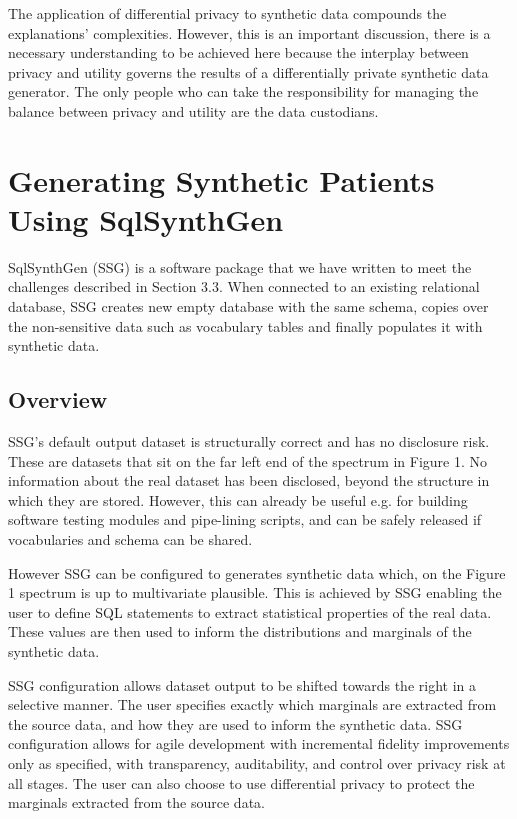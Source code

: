 \documentclass[11pt]{article}
\begin{document}
The application of differential privacy to synthetic data compounds the explanations' complexities. However, this is an important discussion, there is a necessary understanding to be achieved here because the interplay between privacy and utility governs the results of a differentially private synthetic data generator. The only people who can take the responsibility for managing the balance between privacy and utility are the data custodians.


\section{Generating Synthetic Patients Using SqlSynthGen}

SqlSynthGen (SSG) is a software package that we have written to meet the challenges described in Section 3.3. When connected to an existing relational database, SSG creates new empty database with the same schema, copies over the non-sensitive data such as vocabulary tables and finally populates it with synthetic data. 

\subsection{Overview}

SSG's default output dataset is structurally correct and has no disclosure risk. These are datasets that sit on the far left end of the spectrum in Figure 1. No information about the real dataset has been disclosed, beyond the structure in which they are stored. However, this can already be useful e.g. for building software testing modules and pipe-lining scripts, and can be safely released if vocabularies and schema can be shared.

However SSG can be configured to generates synthetic data which, on the Figure 1 spectrum is up to multivariate plausible. This is achieved by SSG enabling the user to define SQL statements to extract statistical properties of the real data. These values are then used to inform the distributions and marginals of the synthetic data. 

SSG configuration allows dataset output to be shifted towards the right in a selective manner. The user specifies exactly which marginals are extracted from the source data, and how they are used to inform the synthetic data. SSG configuration allows for agile development with incremental fidelity improvements only as specified, with transparency, auditability, and control over privacy risk at all stages. The user can also choose to use differential privacy to protect the marginals extracted from the source data.
\end{document}
